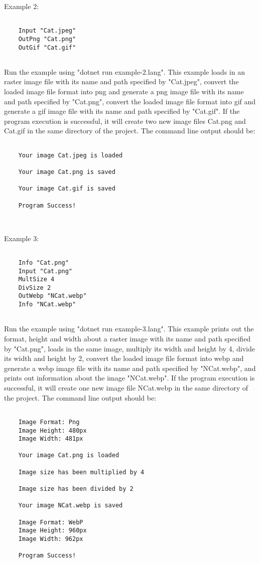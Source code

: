 \documentclass{article}
\begin{document}
    Example 2:  \begin{verbatim}

    Input "Cat.jpeg"
    OutPng "Cat.png"
    OutGif "Cat.gif"
        
    \end{verbatim}

Run the example using "dotnet run example-2.lang". This example loads in an raster image file with its name and path specified by "Cat.jpeg", convert the loaded image file format into png and generate a png image file with its name and path specified by "Cat.png", convert the loaded image file format into gif and generate a gif image file with its name and path specified by "Cat.gif". If the program execution is successful, it will create two new image files Cat.png and Cat.gif in the same directory of the project. The command line output should be: 
    \begin{verbatim}

    Your image Cat.jpeg is loaded 

    Your image Cat.png is saved 

    Your image Cat.gif is saved 

    Program Success!

        
    \end{verbatim}
    

Example 3:  \begin{verbatim}

    Info "Cat.png"
    Input "Cat.png"
    MultSize 4
    DivSize 2
    OutWebp "NCat.webp"
    Info "NCat.webp"
        
    \end{verbatim}

Run the example using "dotnet run example-3.lang". This example prints out the format, height and width about a raster image with its name and path specified by "Cat.png", loads in the same image, multiply its width and height by 4, divide its width and height by 2, convert the loaded image file format into webp and generate a webp image file with its name and path specified by "NCat.webp", and prints out information about the image "NCat.webp". If the program execution is successful, it will create one new image file NCat.webp in the same directory of the project. The command line output should be: 
    \begin{verbatim}

    Image Format: Png
    Image Height: 480px
    Image Width: 481px 

    Your image Cat.png is loaded 

    Image size has been multiplied by 4 

    Image size has been divided by 2 

    Your image NCat.webp is saved 

    Image Format: WebP
    Image Height: 960px
    Image Width: 962px 

    Program Success!
        
    \end{verbatim}
    
\end{document}
